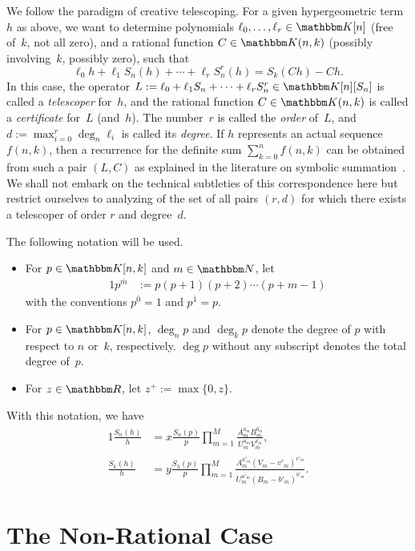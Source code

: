 \documentclass{sig-alternate}
\let\set\mathbbm
\def\K{\set K}
\def\deg{\operatorname{deg}}
\def\rf#1#2{#1^{\overline{#2}}}
\begin{document}
We follow the paradigm of creative telescoping. For a given hypergeometric
term~$h$ as above, we want to determine polynomials
$\ell_0,\dots,\ell_r\in\K[n]$ (free of~$k$, not all zero), and a rational
function $C\in\K(n,k)$ (possibly involving~$k$, possibly zero), such that
\[
  \ell_0 h + \ell_1 S_n(h) + \cdots + \ell_r S_n^r(h) = S_k(C h) - C h.
\]
In this case, the operator $L:=\ell_0 + \ell_1 S_n + \cdots + \ell_r
S_n^r\in\K[n][S_n]$ is called a \emph{telescoper} for~$h$, and the rational
function $C\in\K(n,k)$ is called a \emph{certificate} for~$L$ (and~$h$). The
number~$r$ is called the \emph{order} of~$L$, and $d:=\max_{i=0}^r \deg_n\ell_i$
is called its \emph{degree}. If $h$ represents an actual sequence $f(n,k)$, then
a recurrence for the definite sum $\sum_{k=0}^n f(n,k)$ can be obtained from
such a pair $(L,C)$ as explained in the literature on symbolic
summation~\cite{petkovsek97}. We shall not embark on the technical subtleties of
this correspondence here but restrict ourselves to analyzing of the set of all pairs
$(r,d)$ for which there exists a telescoper of order $r$ and degree~$d$.

The following notation will be used.
\begin{itemize}
\item For $p\in\K[n,k]$ and $m\in\set N$, let
  \begin{alignat*}1
    \rf pm&:=p(p+1)(p+2)\cdots(p+m-1)\end{alignat*}
  with the conventions $\rf p0=1$ and $\rf p1=p$.
\item For $p\in\K[n,k]$, $\deg_n p$ and $\deg_k p$ denote the degree of $p$ with respect
  to $n$ or~$k$, respectively. $\deg p$ without any subscript denotes the total degree of~$p$.
\item For $z\in\set R$, let $z^+:=\max\{0,z\}$.
\end{itemize}
With this notation, we have
\begin{alignat*}1
  \frac{S_n(h)}{h} &= x\frac{S_n(p)}{p}
    \prod_{m=1}^M \frac{\rf{A_m}{a_m}\rf{B_m}{b_m}}{\rf{U_m}{u_m}\rf{V_m}{v_m}},\\
  \frac{S_k(h)}{h} &= y\frac{S_k(p)}{p}
    \prod_{m=1}^M \frac{\rf{A_m}{a'_m}\rf{(V_m-v'_m)}{v'_m}}{\rf{U_m}{u'_m}\rf{(B_m-b'_m)}{b'_m}}.
\end{alignat*}

\section{The Non-Rational Case}\label{sec:trans}
\end{document}
